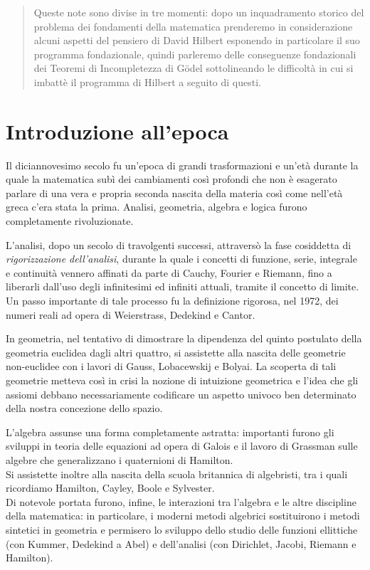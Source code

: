
\begin{abstract}
Queste note sono divise in tre momenti: dopo un inquadramento
storico del problema dei fondamenti della matematica prenderemo in
con\-si\-de\-ra\-zio\-ne alcuni aspetti del pensiero di David Hilbert esponendo
in particolare il suo programma fondazionale, quindi parleremo delle
conseguenze fon\-da\-zio\-na\-li dei Teoremi di Incompletezza di G\"odel sottolineando le difficoltà in cui si imbattè il programma di Hilbert a seguito di questi.
\end{abstract}



\section{Introduzione all'epoca}

Il diciannovesimo secolo fu un'epoca di grandi trasformazioni e un'età durante la quale la matematica subì dei cambiamenti così profondi che non è esagerato parlare di una vera e propria seconda nascita della materia così come nell'età greca c'era stata la prima. Analisi, geometria, algebra e logica furono completamente rivoluzionate.

L'analisi, dopo un secolo di travolgenti successi, attraversò la fase cosiddetta di \emph{rigorizzazione dell'analisi}, durante la quale i concetti di funzione, serie, integrale e continuità vennero affinati da parte di Cauchy, Fourier e Riemann, fino a li\-be\-rar\-li dall'uso degli infinitesimi ed infiniti attuali, tramite il concetto di li\-mi\-te. Un passo importante di tale processo fu la definizione rigorosa, nel 1972, dei numeri reali ad opera di Weierstrass, Dedekind e Cantor.

In geometria, nel tentativo di dimostrare la dipendenza del quinto postulato della geometria euclidea dagli altri quattro, si assistette alla nascita delle geometrie non-euclidee con i lavori di Gauss, Lobacewskij e Bolyai. La sco\-per\-ta di tali geometrie metteva così in crisi la nozione di intuizione geometrica e l'idea che gli assiomi debbano necessariamente codificare un aspetto univoco ben determinato della nostra concezione dello spazio.

L'algebra assunse una forma completamente astratta: importanti furono gli sviluppi in teoria delle equazioni ad opera di Galois e il lavoro di Grassman sulle algebre che generalizzano i quaternioni di Hamilton.\\
Si assistette inoltre alla nascita della scuola britannica di algebristi, tra i quali ricordiamo Hamilton, Cayley, Boole e Sylvester.\\
Di notevole portata furono, infine, le interazioni tra l'algebra e le altre discipline della matematica: in particolare, i moderni metodi algebrici sostituirono i metodi sintetici in geometria e permisero lo sviluppo dello studio delle funzioni ellittiche (con Kummer, Dedekind a Abel) e dell'analisi (con Dirichlet, Jacobi, Riemann e Hamilton).

